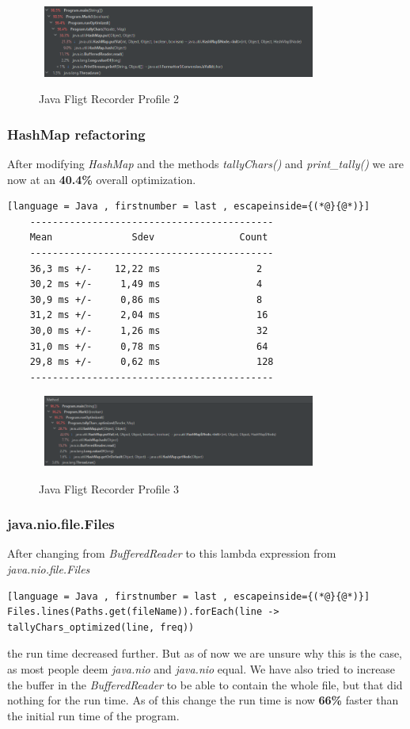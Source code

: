 \begin{figure}[H]
    \centering\
    \includegraphics[width = 0.8\textwidth ]{figures/profile2.PNG}
    \caption{Java Fligt Recorder Profile 2}
    \label{fig:p2}
\end{figure}

\subsubsection{HashMap refactoring}
\label{sec:2.6.2}
After modifying \emph{HashMap} and the methods \emph{tallyChars()} and \emph{print\_tally()} we are now at an \textbf{40.4\%} overall optimization.
\begin{lstlisting}[language = Java , firstnumber = last , escapeinside={(*@}{@*)}]
    -------------------------------------------
    Mean              Sdev               Count
    -------------------------------------------
    36,3 ms +/-    12,22 ms                 2
    30,2 ms +/-     1,49 ms                 4
    30,9 ms +/-     0,86 ms                 8
    31,2 ms +/-     2,04 ms                 16
    30,0 ms +/-     1,26 ms                 32
    31,0 ms +/-     0,78 ms                 64
    29,8 ms +/-     0,62 ms                 128
    -------------------------------------------
\end{lstlisting}

\begin{figure}[H]
    \centering\
    \includegraphics[width = 0.8\textwidth ]{figures/profile3.PNG}
    \caption{Java Fligt Recorder Profile 3}
    \label{fig:p3}
\end{figure}

\subsubsection{java.nio.file.Files}
\label{sec:2.6.3}

After changing from \emph{BufferedReader} to this lambda expression from \emph{java.nio.file.Files} \begin{lstlisting}[language = Java , firstnumber = last , escapeinside={(*@}{@*)}]
Files.lines(Paths.get(fileName)).forEach(line -> tallyChars_optimized(line, freq))
\end{lstlisting} the run time decreased further. But as of now we are unsure why this is the case, as most people deem \emph{java.nio} and \emph{java.nio} equal. We have also tried to increase the buffer in the \emph{BufferedReader} to be able to contain the whole file, but that did nothing for the run time. As of this change the run time is now \textbf{66\%} faster than the initial run time of the program.

